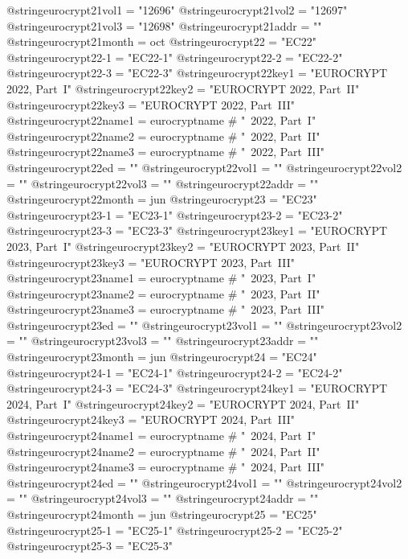 @string{eurocrypt21vol1 =       "12696"}
@string{eurocrypt21vol2 =       "12697"}
@string{eurocrypt21vol3 =       "12698"}
@string{eurocrypt21addr =       ""}
@string{eurocrypt21month =      oct}
@string{eurocrypt22 =           "EC22"}
@string{eurocrypt22-1 =         "EC22-1"}
@string{eurocrypt22-2 =         "EC22-2"}
@string{eurocrypt22-3 =         "EC22-3"}
@string{eurocrypt22key1 =       "EUROCRYPT 2022, Part~I"}
@string{eurocrypt22key2 =       "EUROCRYPT 2022, Part~II"}
@string{eurocrypt22key3 =       "EUROCRYPT 2022, Part~III"}
@string{eurocrypt22name1 =      eurocryptname # "~2022, Part~I"}
@string{eurocrypt22name2 =      eurocryptname # "~2022, Part~II"}
@string{eurocrypt22name3 =      eurocryptname # "~2022, Part~III"}
@string{eurocrypt22ed =         ""}
@string{eurocrypt22vol1 =       ""}
@string{eurocrypt22vol2 =       ""}
@string{eurocrypt22vol3 =       ""}
@string{eurocrypt22addr =       ""}
@string{eurocrypt22month =      jun}
@string{eurocrypt23 =           "EC23"}
@string{eurocrypt23-1 =         "EC23-1"}
@string{eurocrypt23-2 =         "EC23-2"}
@string{eurocrypt23-3 =         "EC23-3"}
@string{eurocrypt23key1 =       "EUROCRYPT 2023, Part~I"}
@string{eurocrypt23key2 =       "EUROCRYPT 2023, Part~II"}
@string{eurocrypt23key3 =       "EUROCRYPT 2023, Part~III"}
@string{eurocrypt23name1 =      eurocryptname # "~2023, Part~I"}
@string{eurocrypt23name2 =      eurocryptname # "~2023, Part~II"}
@string{eurocrypt23name3 =      eurocryptname # "~2023, Part~III"}
@string{eurocrypt23ed =         ""}
@string{eurocrypt23vol1 =       ""}
@string{eurocrypt23vol2 =       ""}
@string{eurocrypt23vol3 =       ""}
@string{eurocrypt23addr =       ""}
@string{eurocrypt23month =      jun}
@string{eurocrypt24 =           "EC24"}
@string{eurocrypt24-1 =         "EC24-1"}
@string{eurocrypt24-2 =         "EC24-2"}
@string{eurocrypt24-3 =         "EC24-3"}
@string{eurocrypt24key1 =       "EUROCRYPT 2024, Part~I"}
@string{eurocrypt24key2 =       "EUROCRYPT 2024, Part~II"}
@string{eurocrypt24key3 =       "EUROCRYPT 2024, Part~III"}
@string{eurocrypt24name1 =      eurocryptname # "~2024, Part~I"}
@string{eurocrypt24name2 =      eurocryptname # "~2024, Part~II"}
@string{eurocrypt24name3 =      eurocryptname # "~2024, Part~III"}
@string{eurocrypt24ed =         ""}
@string{eurocrypt24vol1 =       ""}
@string{eurocrypt24vol2 =       ""}
@string{eurocrypt24vol3 =       ""}
@string{eurocrypt24addr =       ""}
@string{eurocrypt24month =      jun}
@string{eurocrypt25 =           "EC25"}
@string{eurocrypt25-1 =         "EC25-1"}
@string{eurocrypt25-2 =         "EC25-2"}
@string{eurocrypt25-3 =         "EC25-3"}

